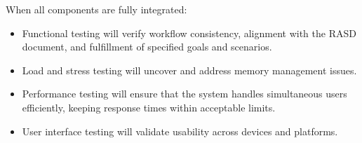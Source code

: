 When all components are fully integrated:

\begin{itemize}
    \item Functional testing will verify workflow consistency, alignment with the RASD document, and fulfillment of specified goals and scenarios.
    \item Load and stress testing will uncover and address memory management issues.
    \item Performance testing will ensure that the system handles simultaneous users efficiently, keeping response times within acceptable limits.
    \item User interface testing will validate usability across devices and platforms.
\end{itemize}


